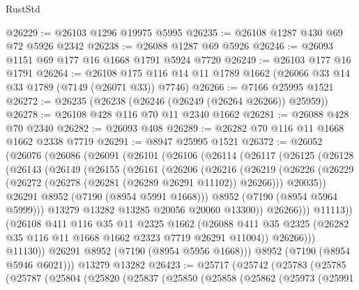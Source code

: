 \begin{lexlean}{RustStd}
\begin{coremodule}
@26229 := @26103 @1296 @19975 @5995
@26235 := @26108 @1287 @430 @69 @72 @5926 @2342
@26238 := @26088 @1287 @69 @5926
@26246 := @26093 @1151 @69 @177 @16 @1668 @1791 @5924 @7720
@26249 := @26103 @177 @16 @1791
@26264 := @26108 @175 @116 @14 @11 @1789 @1662 (@26066 @33 @14 @33 @1789 (@7149 (@26071 @33)) @7746)
@26266 := @7166 @25995 @1521
@26272 := @26235 (@26238 (@26246 (@26249 (@26264 @26266)) @25959))
@26278 := @26108 @428 @116 @70 @11 @2340 @1662
@26281 := @26088 @428 @70 @2340
@26282 := @26093 @408
@26289 := @26282 @70 @116 @11 @1668 @1662 @2338 @7719
@26291 := @8947 @25995 @1521
@26372 := @26052
    (@26076
      (@26086
        (@26091
          (@26101
            (@26106
              (@26114
                (@26117
                  (@26125
                    (@26128
                      (@26143
                        (@26149
                          (@26155
                            (@26161
                              (@26206
                                (@26216
                                  (@26219
                                    (@26226
                                      (@26229
                                        (@26272 (@26278 (@26281 (@26289 @26291 @11102)) @26266)))
                                      @20035))
                                  @26291
                                  @8952
                                  (@7190 (@8954 @5991 @1668)))
                                @8952
                                (@7190 (@8954 @5964 @5999)))
                              @13279
                              @13282
                              @13285
                              @20056
                              @20060
                              @13300))
                          @26266)))
                    @11113))
                (@26108
                  @411
                  @116
                  @35
                  @11
                  @2325
                  @1662
                  (@26088
                    @411
                    @35
                    @2325
                    (@26282 @35 @116 @11 @1668 @1662 @2323 @7719 @26291 @11004))
                  @26266)))
            @11130))
        @26291
        @8952
        (@7190 (@8954 @5956 @1668)))
      @8952
      (@7190 (@8954 @5946 @6021)))
    @13279
    @13282
@26423 := @25717
    (@25742
      (@25783
        (@25785
          (@25787
            (@25804
              (@25820
                (@25837
                  (@25850
                    (@25858
                      (@25862
                        (@25973
                          (@25991

\end{coremodule}
\end{lexlean}
